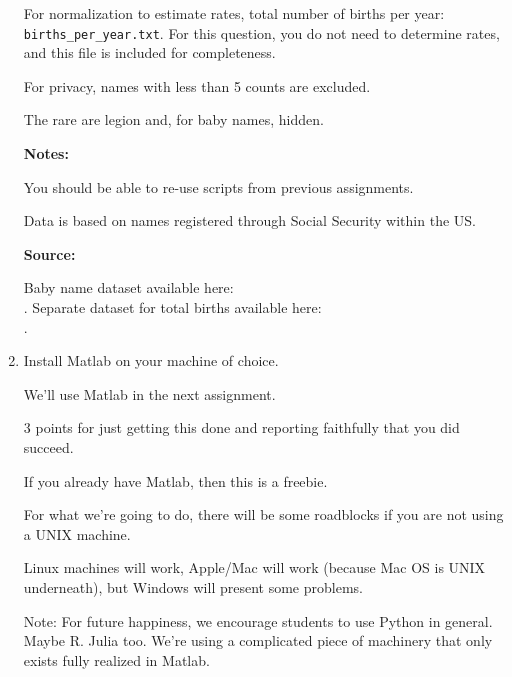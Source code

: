 \begin{enumerate}
  For normalization to estimate rates,
  total number of births per year: \texttt{births\_per\_year.txt}.
  For this question, you do not need to determine rates, and this
  file is included for completeness.

  For privacy, names with less than 5 counts are excluded.

  The rare are legion and, for baby names, hidden.

  \textbf{Notes:}

  You should be able to re-use scripts from previous assignments.

  Data is based on names registered through Social Security within the US.

  \textbf{Source:}

  Baby name dataset available here:\\
  .
  Separate dataset for total births available here:\\
  .

  
   \solutionstart


   \solutionend

\item
  
  Install Matlab on your machine of choice.

  We'll use Matlab in the next assignment.

  3 points for just getting this done and reporting faithfully that you did succeed.

  If you already have Matlab, then this is a freebie.

  For what we're going to do, there will be some roadblocks if you are not using a UNIX machine.

  Linux machines will work, Apple/Mac will work (because Mac OS is UNIX underneath),
  but Windows will present some problems.

  Note: For future happiness, we encourage students to use Python in general. Maybe R.
  Julia too.  We're using a complicated piece of machinery that only exists fully
  realized in Matlab.

\end{enumerate}

